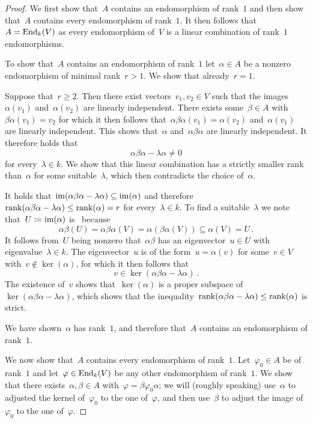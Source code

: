\begin{proof}
  We first show that~$A$ contains an endomorphism of rank~$1$ and then show that~$A$ contains every endomorphism of rank~$1$.
  It then follows that~$A = \operatorname{End}_k(V)$ as every endomorphism of~$V$ is a linear combination of rank~$1$ endomorphisms.
  
  To show that~$A$ contains an endomorphism of rank~$1$ let~$\alpha \in A$ be a nonzero endomorphism of minimal rank~$r > 1$.
  We show that already~$r = 1$.
  
  Suppose that~$r \geq 2$.
  Then there exist vectors~$v_1, v_2 \in V$ such that the images~$\alpha(v_1)$ and~$\alpha(v_2)$ are linearly independent.
  There exists some~$\beta \in A$ with~$\beta \alpha(v_1) = v_2$ for which it then follows that~$\alpha \beta \alpha(v_1) = \alpha(v_2)$ and~$\alpha(v_1)$ are linearly independent.
  This shows that~$\alpha$ and~$\alpha \beta \alpha$ are linearly independent.
  It therefore holds that
  \[
    \alpha \beta \alpha - \lambda \alpha \neq 0
  \]
  for every~$\lambda \in k$.
  We show that this linear combination has a strictly smaller rank than~$\alpha$ for some suitable~$\lambda$, which then contradicts the choice of~$\alpha$.
  
  It holds that~$\operatorname{im}(\alpha \beta \alpha - \lambda \alpha) \subseteq \operatorname{im}(\alpha)$ and therefore~$\operatorname{rank}(\alpha \beta \alpha - \lambda \alpha) \leq \operatorname{rank}(\alpha) = r$ for every~$\lambda \in k$.
  To find a suitable~$\lambda$ we note that~$U \coloneqq \operatorname{im}(\alpha)$ is~ because
  \[
              \alpha \beta(U)
    =         \alpha \beta \alpha(V)
    =         \alpha( \beta \alpha(V) )
    \subseteq \alpha(V)
    =         U \,.
  \]
  It follows from~$U$ being nonzero that~$\alpha \beta$ has an eigenvector~$u \in U$ with eigenvalue~$\lambda \in k$.
  The eigenvector~$u$ is of the form~$u = \alpha(v)$ for some~$v \in V$ with~$v \notin \ker(\alpha)$, for which it then follows that
  \[
        v
    \in \ker(\alpha \beta \alpha - \lambda \alpha) \,.
  \]
  The existence of~$v$ shows that~$\ker(\alpha)$ is a proper subspace of~$\ker(\alpha \beta \alpha - \lambda \alpha)$, which shows that the inequality~$\operatorname{rank}(\alpha \beta \alpha - \lambda \alpha) \leq \operatorname{rank}(\alpha)$ is strict.
  
  We have shown~$\alpha$ has rank~$1$, and therefore that~$A$ contains an endomorphism of rank~$1$.
  
  We now show that~$A$ contains every endomorphism of rank~$1$.
  Let~$\varphi_0 \in A$ be of rank~$1$ and let~$\varphi \in \operatorname{End}_k(V)$ be any other endomorphism of rank~$1$.
  We show that there exists~$\alpha, \beta \in A$ with~$\varphi = \beta \varphi_0 \alpha$;
  we will (roughly speaking) use~$\alpha$ to adjusted the kernel of~$\varphi_0$ to the one of~$\varphi$, and then use~$\beta$ to adjust the image of~$\varphi_0$ to the one of~$\varphi$.
  

\end{proof}
